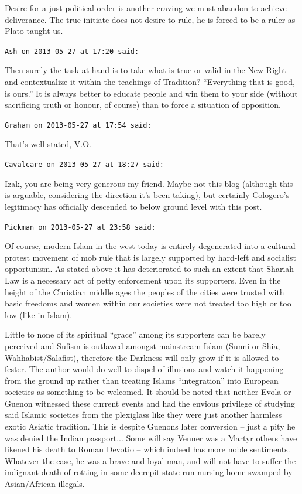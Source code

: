 \begin{footnotesize}
\begin{sffamily}
Desire for a just political order is another craving we must abandon to achieve deliverance. The true initiate does not desire to rule, he is forced to be a ruler as Plato taught us.

\hfill

\texttt{Ash on 2013-05-27 at 17:20 said:}

Then surely the task at hand is to take what is true or valid in the New Right and contextualize it within the teachings of Tradition? ``Everything that is good, is ours.'' It is always better to educate people and win them to your side (without sacrificing truth or honour, of course) than to force a situation of opposition.

\hfill

\texttt{Graham on 2013-05-27 at 17:54 said:}

That's well-stated, V.O.

\hfill

\texttt{Cavalcare on 2013-05-27 at 18:27 said:}

Izak, you are being very generous my friend. Maybe not this blog (although this is arguable, considering the direction it's been taking), but certainly Cologero's legitimacy has officially descended to below ground level with this post.

\hfill

\texttt{Pickman on 2013-05-27 at 23:58 said:}

Of course, modern Islam in the west today is entirely degenerated into a cultural protest movement of mob rule that is largely supported by hard-left and socialist opportunism. As stated above it has deteriorated to such an extent that Shariah Law is a necessary act of petty enforcement upon its supporters. Even in the height of the Christian middle ages the peoples of the cities were trusted with basic freedoms and women within our societies were not treated too high or too low (like in Islam).

Little to none of its spiritual ``grace'' among its supporters can be barely perceived and Sufism is outlawed amongst mainstream Islam (Sunni or Shia, Wahhabist/Salafist), therefore the Darkness will only grow if it is allowed to fester. The author would do well to dispel of illusions and watch it happening from the ground up rather than treating Islams ``integration'' into European societies as something to be welcomed. It should be noted that neither Evola or Guenon witnessed these current events and had the envious privilege of studying said Islamic societies from the plexiglass like they were just another harmless exotic Asiatic tradition. This is despite Guenons later conversion -- just a pity he was denied the Indian passport... Some will say Venner was a Martyr others have likened his death to Roman Devotio -- which indeed has more noble sentiments. Whatever the case, he was a brave and loyal man, and will not have to suffer the indignant death of rotting in some decrepit state run nursing home swamped by Asian/African illegals.


\end{sffamily}
\end{footnotesize}
